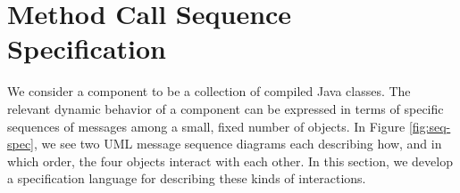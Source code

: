 \section{Method Call Sequence Specification} \label{sec:spec}

We consider a component to be a collection of compiled Java classes. The
relevant dynamic behavior of a component can be expressed in terms of specific
sequences of messages among a small, fixed number of objects. In
Figure \ref{fig:seq-spec}, we see two UML message sequence diagrams each
describing how, and in which order, the four objects interact with each other. In this
section, we develop a specification language for describing these kinds of
interactions.
 


